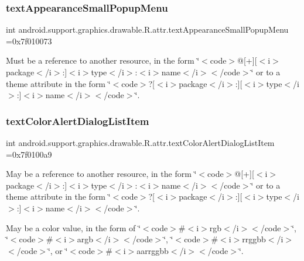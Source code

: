 \subsubsection{\texorpdfstring{text\+Appearance\+Small\+Popup\+Menu}{textAppearanceSmallPopupMenu}}
{\footnotesize\ttfamily int android.\+support.\+graphics.\+drawable.\+R.\+attr.\+text\+Appearance\+Small\+Popup\+Menu =0x7f010073\hspace{0.3cm}{\ttfamily [static]}}

Must be a reference to another resource, in the form \char`\"{}$<$code$>$@\mbox{[}+\mbox{]}\mbox{[}$<$i$>$package$<$/i$>$\+:\mbox{]}$<$i$>$type$<$/i$>$\+:$<$i$>$name$<$/i$>$$<$/code$>$\char`\"{} or to a theme attribute in the form \char`\"{}$<$code$>$?\mbox{[}$<$i$>$package$<$/i$>$\+:\mbox{]}\mbox{[}$<$i$>$type$<$/i$>$\+:\mbox{]}$<$i$>$name$<$/i$>$$<$/code$>$\char`\"{}. \mbox{\label{classandroid_1_1support_1_1graphics_1_1drawable_1_1R_1_1attr_ac32aaf1aaaf96e08cca8c4d6bb090736}} 
\subsubsection{\texorpdfstring{text\+Color\+Alert\+Dialog\+List\+Item}{textColorAlertDialogListItem}}
{\footnotesize\ttfamily int android.\+support.\+graphics.\+drawable.\+R.\+attr.\+text\+Color\+Alert\+Dialog\+List\+Item =0x7f0100a9\hspace{0.3cm}{\ttfamily [static]}}

May be a reference to another resource, in the form \char`\"{}$<$code$>$@\mbox{[}+\mbox{]}\mbox{[}$<$i$>$package$<$/i$>$\+:\mbox{]}$<$i$>$type$<$/i$>$\+:$<$i$>$name$<$/i$>$$<$/code$>$\char`\"{} or to a theme attribute in the form \char`\"{}$<$code$>$?\mbox{[}$<$i$>$package$<$/i$>$\+:\mbox{]}\mbox{[}$<$i$>$type$<$/i$>$\+:\mbox{]}$<$i$>$name$<$/i$>$$<$/code$>$\char`\"{}. 

May be a color value, in the form of \char`\"{}$<$code$>$\#$<$i$>$rgb$<$/i$>$$<$/code$>$\char`\"{}, \char`\"{}$<$code$>$\#$<$i$>$argb$<$/i$>$$<$/code$>$\char`\"{}, \char`\"{}$<$code$>$\#$<$i$>$rrggbb$<$/i$>$$<$/code$>$\char`\"{}, or \char`\"{}$<$code$>$\#$<$i$>$aarrggbb$<$/i$>$$<$/code$>$\char`\"{}. \mbox{\label{classandroid_1_1support_1_1graphics_1_1drawable_1_1R_1_1attr_aa76db797cbe85409fcb6b55121ffaec4}} 
